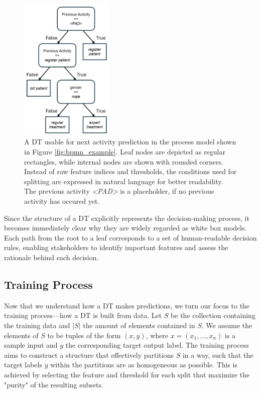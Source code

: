 \begin{figure}[h!]
    \centering
    \includegraphics[width=0.4\textwidth]{gfx/decision_tree.png}
    \caption{
    A DT usable for next activity prediction in the process model shown in Figure \ref{fig:bpmn_example}.
    Leaf nodes are depicted as regular rectangles, while internal nodes are shown with rounded corners.
    Instead of raw feature indices and thresholds, the conditions used for splitting are expressed in natural language for better readability.
    The previous activity \textit{<PAD>} is a placeholder, if no previous activity has occured yet.
    }
    \label{fig:decision_tree}
\end{figure}

Since the structure of a DT explicitly represents the decision-making process,
it becomes immediately clear why they are widely regarded as white box models.
Each path from the root to a leaf corresponds to a set of human-readable decision rules,
enabling stakeholders to identify important features and assess the rationale behind each decision.

\subsection{Training Process}
\label{sec:dt_training}
Now that we understand how a DT makes predictions,
we turn our focus to the training process—how a DT is built from data.
Let $S$ be the collection containing the training data
and $|S|$ the amount of elements contained in $S$.
We assume the elements of $S$ to be tuples of the form $(x, y)$,
where $x = (x_1, ..., x_n)$ is a sample input and $y$ the corresponding target output label.
The training process aims to construct a structure that effectively partitions $S$ in a way,
such that the target labels $y$ within the partitions are as homogeneous as possible.
This is achieved by selecting the feature
and threshold for each split that maximize the "purity" of the resulting subsets.

